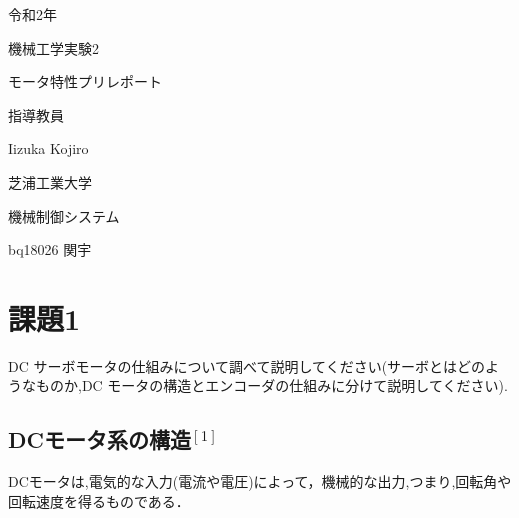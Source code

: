 \documentclass[xelatex,ja=standard,jafont=noto]{bxjsarticle}
\date{Oct.13 2020}
\begin{document}
	\begin{titlepage}
			\begin{center}
				
				{\Large 令和2年}
				
				\vspace{10truept}
				
				{\Large 機械工学実験2}
				
				\vspace*{140truept}
				
				{\Huge モータ特性プリレポート} 
				
				\vspace{160truept}
				
				{\Large 指導教員}
				
				\vspace{10truept}
				
				{\Large Iizuka Kojiro}
				
				\vspace{70truept}
				
				{\Large 芝浦工業大学}
				
				\vspace{10truept}
				
				{\Large 機械制御システム}
				
				\vspace{30truept}
				
				{\Large bq18026 関宇}      
				
			\end{center}
		\end{titlepage}





\section{課題1}

DC サーボモータの仕組みについて調べて説明してください(サーボとはどのようなものか,DC モータの構造とエンコーダの仕組みに分けて説明してください).\\

\subsection{DCモータ系の構造$ ^{[1]}　$}

DCモータは,電気的な入力(電流や電圧)によって，機械的な出力,つまり,回転角や回転速度を得るものである．\\
\end{document}

